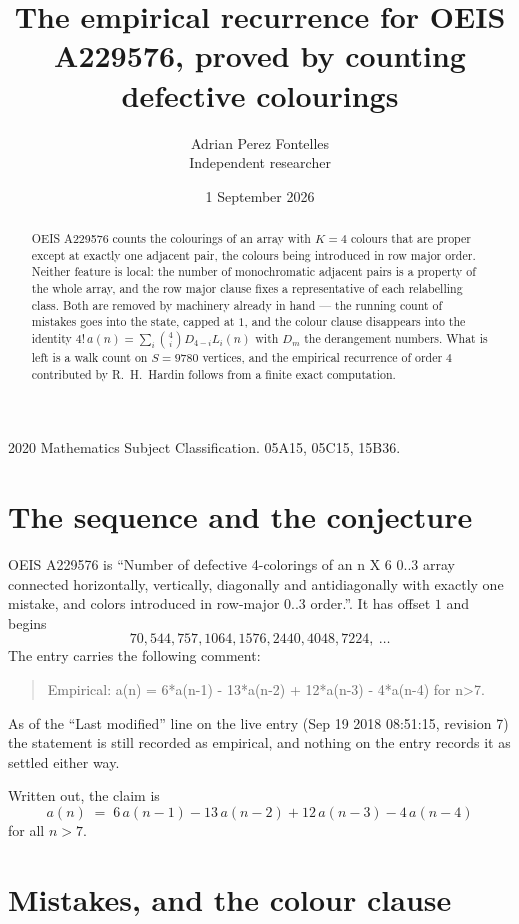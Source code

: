 \documentclass[11pt,a4paper]{article}
\title{The empirical recurrence for OEIS A229576, proved by counting defective colourings}
\author{Adrian Perez Fontelles\\ \small Independent researcher}
\date{1 September 2026}
\theoremstyle{plain}
\theoremstyle{definition}
\begin{document}
\maketitle

\begin{abstract}
OEIS A229576 counts the colourings of an array with $K=4$ colours that are proper except at
exactly one adjacent pair, the colours being introduced in row
major order. Neither feature is local: the number of monochromatic adjacent pairs is a
property of the whole array, and the row major clause fixes a representative of each
relabelling class. Both are removed by machinery already in hand --- the running count of
mistakes goes into the state, capped at $1$, and the colour clause disappears into the
identity $4!\,a(n)=\sum_i\binom{4}{i}D_{4-i}L_i(n)$ with $D_m$ the derangement
numbers. What is left is a walk count on $S=9780$ vertices, and the empirical recurrence of
order $4$ contributed by R.~H.~Hardin follows from a finite exact computation.
\end{abstract}

\noindent\small 2020 Mathematics Subject Classification. 05A15, 05C15, 15B36.\normalsize

\section{The sequence and the conjecture}

OEIS A229576 is ``Number of defective 4-colorings of an n X 6 0..3 array connected horizontally, vertically, diagonally and antidiagonally with exactly one mistake, and colors introduced in row-major 0..3 order.''. It has offset $1$ and begins
\[
70, 544, 757, 1064, 1576, 2440, 4048, 7224,\ \dots
\]
The entry carries the following comment:
\begin{quote}\small
Empirical: a(n) = 6*a(n-1) - 13*a(n-2) + 12*a(n-3) - 4*a(n-4) for n>7.
\end{quote}
As of the ``Last modified'' line on the live entry (Sep 19 2018 08:51:15, revision 7) the statement is
still recorded as empirical, and nothing on the entry records it as settled either way.

Written out, the claim is
\begin{equation}\label{eq:conj}
a(n)\;=\;6\,a(n-1) - 13\,a(n-2) + 12\,a(n-3) - 4\,a(n-4)
\end{equation}
for all $n>7$.

\section{Mistakes, and the colour clause}
\end{document}
